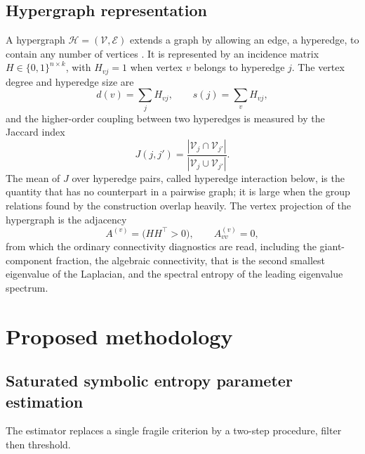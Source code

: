 \documentclass[10pt,a4paper,twocolumn]{article}
\begin{document}
\subsection{Hypergraph representation}

A hypergraph $\mathcal{H} = (\mathcal{V},\mathcal{E})$ extends a graph by
allowing an edge, a hyperedge, to contain any number of vertices
\citep{berge1973}.  It is represented by an incidence matrix
$H \in \{0,1\}^{n \times k}$, with $H_{vj}=1$ when vertex $v$ belongs to
hyperedge $j$.  The vertex degree and hyperedge size are
\begin{equation}
d(v) = \sum_{j} H_{vj}, \qquad s(j) = \sum_{v} H_{vj} ,
\label{eq:degrees}
\end{equation}
and the higher-order coupling between two hyperedges is measured by the
Jaccard index
\begin{equation}
J(j,j') = \frac{|\mathcal{V}_j \cap \mathcal{V}_{j'}|}
{|\mathcal{V}_j \cup \mathcal{V}_{j'}|} .
\label{eq:jaccard}
\end{equation}
The mean of $J$ over hyperedge pairs, called hyperedge interaction below, is
the quantity that has no counterpart in a pairwise graph; it is large when
the group relations found by the construction overlap heavily.  The vertex
projection of the hypergraph is the adjacency
\begin{equation}
A^{(v)} = \bigl(H H^{\top} > 0\bigr) , \qquad
A^{(v)}_{vv} = 0 ,
\label{eq:projection}
\end{equation}
from which the ordinary connectivity diagnostics are read, including the
giant-component fraction, the algebraic connectivity, that is the second
smallest eigenvalue of the Laplacian, and the spectral entropy of the
leading eigenvalue spectrum.

\section{Proposed methodology}
\label{sec:method}

\subsection{Saturated symbolic entropy parameter estimation}
\label{sec:lpf}

The estimator replaces a single fragile criterion by a two-step procedure,
filter then threshold.
\end{document}
